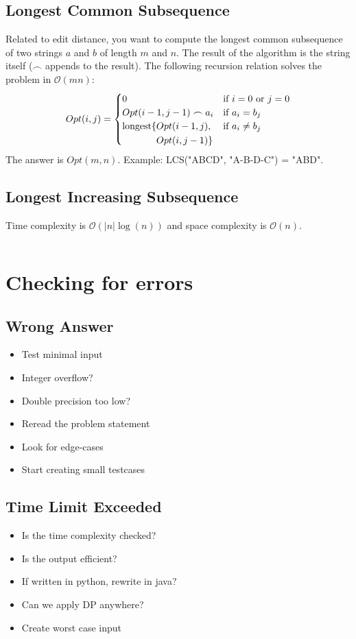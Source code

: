 \documentclass[8pt,a4paper,landscape,oneside]{amsart}
\newcommand{\code}[1]{\inputminted[fontsize=\normalsize,baselinestretch=1]{java}{code/#1}}
\newcommand{\bigO}{\mathcal{O}}
\begin{document}
\begin{multicols*}{3}
  \subsection{Longest Common Subsequence}
  Related to edit distance, you want to compute the longest common subsequence of two strings $a$ and $b$ of length $m$ and $n$. The result of the algorithm is the string itself ($\frown$ appends to the result). The following recursion relation solves the problem in $\bigO(mn)$:
  \[
  Opt(i,j) = \begin{cases}
  0 & \text{if } i=0 \text{ or } j=0 \\
  Opt(i-1,j-1) \frown a_i & \text{if } a_i=b_j \\
  \begin{aligned}[t]\arraycolsep=0pt
    \mathrm{longest}\lbrace &
      Opt(i-1,j), \\ & 
      Opt(i,j-1) \rbrace
  \end{aligned} & \text{if } a_i\neq b_j
  \end{cases}
  \]
  The answer is $Opt(m,n)$. Example: LCS("ABCD", "A-B-D-C") = "ABD".
  
  \subsection{Longest Increasing Subsequence}
  Time complexity is $\bigO(|n|\log(n))$ and space complexity is $\bigO(n)$.
  \code{DP/LongestIncreasingSubsequence.java}
        
        
\section{Checking for errors}
  \subsection{Wrong Answer}
    \begin{itemize}
    \item Test minimal input
    \item Integer overflow?
    \item Double precision too low?
    \item Reread the problem statement
    \item Look for edge-cases
    \item Start creating small testcases
    \end{itemize}
  \subsection{Time Limit Exceeded}
    \begin{itemize}
    \item Is the time complexity checked?
    \item Is the output efficient?
    \item If written in python, rewrite in java?
    \item Can we apply DP anywhere?
    \item Create worst case input
    \end{itemize}

\end{multicols*}
\end{document}
